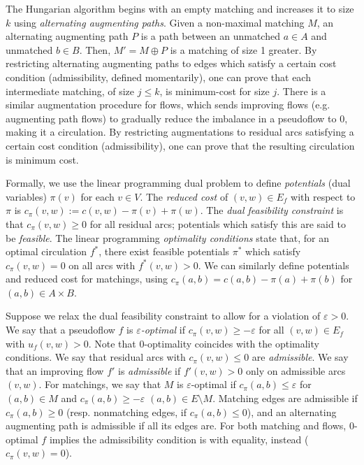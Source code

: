 \documentclass[11pt]{article}
\def\eps{\varepsilon}
\theoremstyle{plain}
\begin{document}
The Hungarian algorithm begins with an empty matching and increases it to size 
$k$ using \emph{alternating augmenting paths}.
Given a non-maximal matching $M$, an alternating augmenting path $P$ is a path
between an unmatched $a \in A$ and unmatched $b \in B$.
Then, $M' = M \oplus P$ is a matching of size 1 greater.
By restricting alternating augmenting paths to edges which satisfy a certain 
cost condition (admissibility, defined momentarily), one can prove that each 
intermediate matching, of size $j \leq k$, is minimum-cost for size $j$.
There is a similar augmentation procedure for flows, which sends improving 
flows (e.g. augmenting path flows) to gradually reduce the imbalance in a 
pseudoflow to 0, making it a circulation.
By restricting augmentations to residual arcs satisfying a certain cost 
condition (admissibility), one can prove that the resulting circulation is 
minimum cost.

Formally, we use the linear programming dual problem to define 
\emph{potentials} (dual variables) $\pi(v)$ for each $v \in V$. 
The \emph{reduced cost} of $(v, w) \in E_f$ with respect to $\pi$ is 
$c_\pi(v, w) := c(v, w) - \pi(v) + \pi(w)$.
The \emph{dual feasibility constraint} is that $c_\pi(v, w) \geq 0$ for all 
residual arcs; potentials which satisfy this are said to be \emph{feasible}.
The linear programming \emph{optimality conditions} state that, for an optimal 
circulation $f^*$, there exist feasible potentials $\pi^*$ which satisfy 
$c_\pi(v, w) = 0$ on all arcs with $f^*(v, w) > 0$.
We can similarly define potentials and reduced cost for matchings, using
$c_\pi(a, b) = c(a, b) - \pi(a) + \pi(b)$ for $(a, b) \in A \times B$.

Suppose we relax the dual feasibility constraint to allow for a violation of 
$\eps > 0$.
We say that a pseudoflow $f$ is \emph{$\eps$-optimal} if 
$c_\pi(v, w) \geq -\eps$ for all $(v, w) \in E_f$ with $u_f(v, w) > 0$.
Note that 0-optimality coincides with the optimality conditions.
We say that residual arcs with $c_\pi(v, w) \leq 0$ are \emph{admissible}.
We say that an improving flow $f'$ is \emph{admissible} if $f'(v, w) > 0$
only on admissible arcs $(v, w)$.
For matchings, we say that $M$ is $\eps$-optimal if $c_\pi(a, b) \leq \eps$ for 
$(a, b) \in M$ and $c_\pi(a, b) \geq -\eps$ $(a, b) \in E \setminus M$.
Matching edges are admissible if $c_\pi(a, b) \geq 0$ (resp. nonmatching edges, 
if $c_\pi(a, b) \leq 0$), and an alternating augmenting path is admissible
if all its edges are.
For both matching and flows, 0-optimal $f$ implies the admissibility condition 
is with equality, instead ($c_\pi(v, w) = 0$).
\end{document}
